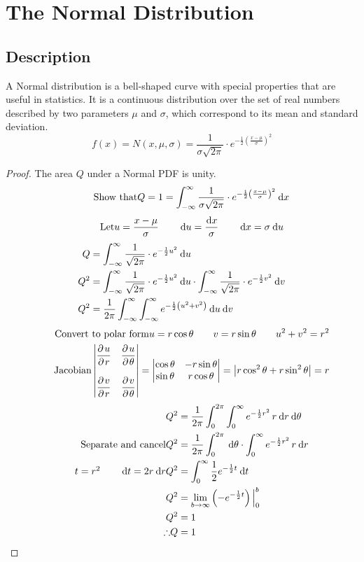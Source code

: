 \documentclass[11pt,leqno,letterpaper]{article}
\begin{document}
\section{The Normal Distribution}
\subsection{Description}
A Normal distribution is a bell-shaped curve
with special properties that are useful in statistics.
It is a continuous distribution over the set of real numbers
described by two parameters $\mu$ and $\sigma$, which
correspond to its mean and standard deviation.
\[
\tag{PDF}
f(x) = 
N(x,\mu ,\sigma) = \frac{1}{\sigma \sqrt{2 \pi}} \cdot
e^{-\frac{1}{2}\left(\frac{x - \mu}{\sigma}\right)^2}
\]
\begin{proof}
The area $Q$ under a Normal PDF is unity.
\[
\tag*{Show that}
Q = 1 =
\int_{-\infty}^{\infty} \frac{1}{\sigma \sqrt{2 \pi}} \cdot
e^{-\frac{1}{2}\left(\frac{x - \mu}{\sigma}\right)^2} \:\mathrm{d}x
\]
\[
\tag*{Let}
u=\frac{x-\mu}{\sigma} \qquad
\:\mathrm{d}u = \frac{\!\:\mathrm{d}x}{\sigma} \qquad \:\mathrm{d}x = \sigma \:\mathrm{d}u
\]
\begin{align*}
Q &= \int_{-\infty}^{\infty} \frac{1}{\sqrt{2\pi}} \cdot
e^{-\frac{1}{2}u^2} \:\mathrm{d}u \\
Q^2 &= \int_{-\infty}^{\infty} \frac{1}{\sqrt{2\pi}} \cdot
e^{-\frac{1}{2}u^2} \:\mathrm{d}u \cdot
\int_{-\infty}^{\infty} \frac{1}{\sqrt{2\pi}} \cdot
e^{-\frac{1}{2}v^2} \:\mathrm{d}v \\
Q^2 &= \frac{1}{2\pi} \int_{-\infty}^{\infty} \int_{-\infty}^{\infty}
e^{-\frac{1}{2}\left(u^2 + v^2 \right)} \:\mathrm{d}u \:\mathrm{d}v
\end{align*}
\begin{align*}
\tag*{Convert to polar form}
u = r \cos \theta \qquad v = r \sin \theta \qquad
u^2+v^2=r^2 \\
\tag*{Jacobian}
\begin{vmatrix}
\derivp{u}{r}&\derivp{u}{\theta}\\ \\
\derivp{v}{r}&\derivp{v}{\theta}
\end{vmatrix} =
\begin{vmatrix}
\cos \theta & -r \sin \theta \\
\sin \theta & r \cos \theta
\end{vmatrix} =
\left|r\cos^2\theta+r\sin^2\theta\right| = r
\end{align*}
\begin{align*}
Q^2 &= \frac{1}{2\pi} \int_{0}^{2\pi} \int_{0}^{\infty}
e^{-\frac{1}{2}r^2} \, r \dr \dth \\
\tag*{Separate and cancel}
Q^2 &= \frac{1}{2\pi} \int_{0}^{2\pi} \dth \cdot
\int_{0}^{\infty} e^{-\frac{1}{2}r^2} \, r \dr \\
\tag*{$t=r^2 \qquad \dt= 2r \dr$}
Q^2 &= \int_{0}^{\infty} \frac{1}{2} e^{-\frac{1}{2}t} \dt \\
Q^2 &= \lim_{b\to \infty} \left(-e^{-\frac{1}{2}t}\right)\Big|_0^b \\
Q^2 &= 1 \\
\tag*{$\therefore$}
Q&=1
\end{align*}
\end{proof}
\end{document}
